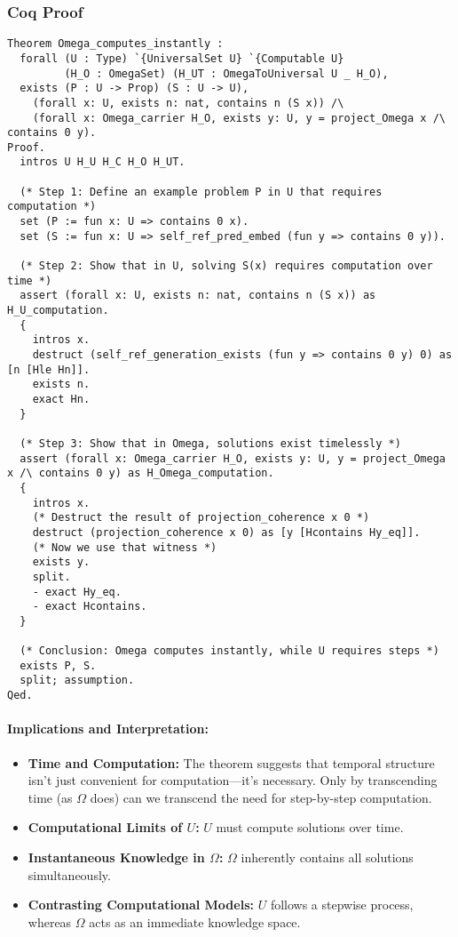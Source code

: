 \documentclass[12pt]{article}
\begin{document}
\subsubsection{Coq Proof}
\begin{lstlisting}[language=Coq]
Theorem Omega_computes_instantly :
  forall (U : Type) `{UniversalSet U} `{Computable U}
         (H_O : OmegaSet) (H_UT : OmegaToUniversal U _ H_O),
  exists (P : U -> Prop) (S : U -> U),
    (forall x: U, exists n: nat, contains n (S x)) /\
    (forall x: Omega_carrier H_O, exists y: U, y = project_Omega x /\ contains 0 y).
Proof.
  intros U H_U H_C H_O H_UT.
  
  (* Step 1: Define an example problem P in U that requires computation *)
  set (P := fun x: U => contains 0 x).
  set (S := fun x: U => self_ref_pred_embed (fun y => contains 0 y)).

  (* Step 2: Show that in U, solving S(x) requires computation over time *)
  assert (forall x: U, exists n: nat, contains n (S x)) as H_U_computation.
  { 
    intros x.
    destruct (self_ref_generation_exists (fun y => contains 0 y) 0) as [n [Hle Hn]].
    exists n.
    exact Hn.
  }

  (* Step 3: Show that in Omega, solutions exist timelessly *)
  assert (forall x: Omega_carrier H_O, exists y: U, y = project_Omega x /\ contains 0 y) as H_Omega_computation.
  { 
    intros x.
    (* Destruct the result of projection_coherence x 0 *)
    destruct (projection_coherence x 0) as [y [Hcontains Hy_eq]].
    (* Now we use that witness *)
    exists y.
    split.
    - exact Hy_eq.
    - exact Hcontains.
  }

  (* Conclusion: Omega computes instantly, while U requires steps *)
  exists P, S.
  split; assumption.
Qed.
\end{lstlisting}

\paragraph{Implications and Interpretation:}
\begin{itemize}
    \item \textbf{Time and Computation:} The theorem suggests that temporal structure isn't just convenient for computation—it's necessary. Only by transcending time (as \( \Omega \) does) can we transcend the need for step-by-step computation.
    \item \textbf{Computational Limits of \( U \):} \( U \) must compute solutions over time.
    \item \textbf{Instantaneous Knowledge in \( \Omega \):} \( \Omega \) inherently contains all solutions simultaneously.
    \item \textbf{Contrasting Computational Models:} \( U \) follows a stepwise process, whereas \( \Omega \) acts as an immediate knowledge space.
\end{itemize}
\end{document}
